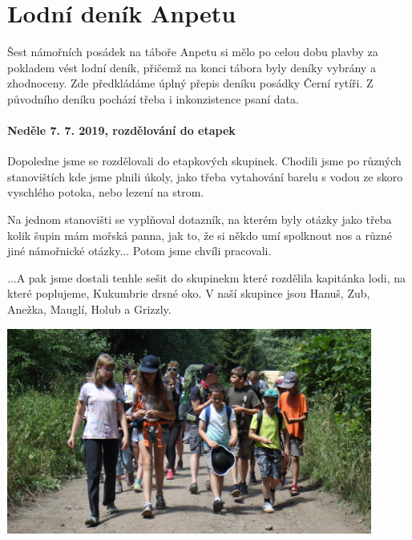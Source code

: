 \chapter{Lodní deník Anpetu} %
\label{cha:lodní_deník_etapkové_skupiny_černí_rytíři_anpetu_}

Šest námořních posádek na táboře Anpetu si mělo po celou dobu plavby za pokladem vést lodní deník, přičemž na konci tábora byly deníky vybrány a zhodnoceny. Zde předkládáme úplný přepis deníku posádky Černí rytíři. Z původního deníku pochází třeba i inkonzistence psaní data.


\label{sub:lodní_deník_etapkové_skupiny_černí_rytíři}


\subsubsection{Neděle 7. 7. 2019, rozdělování do etapek} %
\label{ssub:rozdělování_do_etapek}

Dopoledne jsme se rozdělovali do etapkových skupinek. Chodili jsme po různých stanovištích kde jsme plnili úkoly, jako třeba vytahování barelu s vodou ze skoro vyschlého potoka, nebo lezení na strom.

Na jednom stanovišti se vyplňoval dotazník, na kterém byly otázky jako třeba kolik šupin mám mořská panna, jak to, že si někdo umí spolknout nos a různé jiné námořnické otázky...
Potom jsme chvíli pracovali.

...A pak jsme dostali tenhle sešit do skupinekm které rozdělila kapitánka lodi, na které poplujeme, Kukumbrie drsné oko. V naší skupince jsou Hanuš, Zub, Anežka, Mauglí, Holub a Grizzly.


\begin{center}
	\includegraphics[width=12cm]{img/anpetu_tabor/prichod.JPG}
\end{center}


